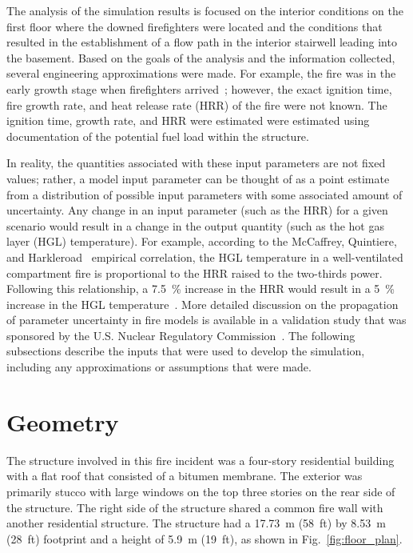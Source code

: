 \documentclass[12pt,oneside]{book}
\begin{document}
The analysis of the simulation results is focused on the interior conditions on the first floor where the downed firefighters were located and the conditions that resulted in the establishment of a flow path in the interior stairwell leading into the basement. Based on the goals of the analysis and the information collected, several engineering approximations were made. For example, the fire was in the early growth stage when firefighters arrived~\cite{NIOSH:Bowyer2}; however, the exact ignition time, fire growth rate, and heat release rate (HRR) of the fire were not known. The ignition time, growth rate, and HRR were estimated were estimated using documentation of the potential fuel load within the structure.

In reality, the quantities associated with these input parameters are not fixed values; rather, a model input parameter can be thought of as a point estimate from a distribution of possible input parameters with some associated amount of uncertainty. Any change in an input parameter (such as the HRR) for a given scenario would result in a change in the output quantity (such as the hot gas layer (HGL) temperature). For example, according to the McCaffrey, Quintiere, and Harkleroad~\cite{SFPE:Walton} empirical correlation, the HGL temperature in a well-ventilated compartment fire is proportional to the HRR raised to the two-thirds power. Following this relationship, a 7.5~\% increase in the HRR would result in a 5~\% increase in the HGL temperature~\cite{NUREG_1824_Sup_1}. More detailed discussion on the propagation of parameter uncertainty in fire models is available in a validation study that was sponsored by the U.S. Nuclear Regulatory Commission~\cite{NUREG_1824_Sup_1}. The following subsections describe the inputs that were used to develop the simulation, including any approximations or assumptions that were made.

\section{Geometry}
\label{sec:geometry}

The structure involved in this fire incident was a four-story residential building with a flat roof that consisted of a bitumen membrane. The exterior was primarily stucco with large windows on the top three stories on the rear side of the structure. The right side of the structure shared a common fire wall with another residential structure. The structure had a 17.73~m (58~ft) by 8.53~m (28~ft) footprint and a height of 5.9~m (19~ft), as shown in Fig.~\ref{fig:floor_plan}.
\end{document}
